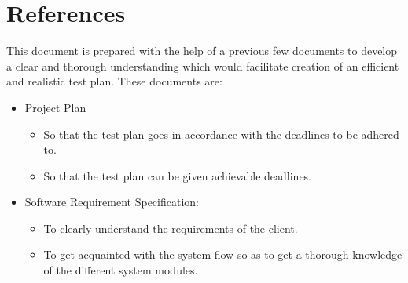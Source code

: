 \documentclass[12pt]{article}
\begin{document}
\section{References}
This document is prepared with the help of a previous few documents to develop a clear and thorough understanding which would facilitate creation of an efficient and realistic test plan. These documents are:
\begin{itemize}
    \item Project Plan
    \begin{itemize}
        \item So that the test plan goes in accordance with the deadlines to be adhered to.
        \item So that the test plan can be given achievable deadlines.
    \end{itemize}
    \item Software Requirement Specification:
    \begin{itemize}
        \item To clearly understand the requirements of the client.
        \item To get acquainted with the system flow so as to get a thorough knowledge of the different system modules.
 
    \end{itemize}
\end{itemize}
\end{document}
